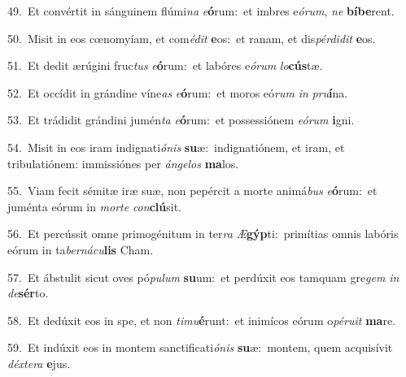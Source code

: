 {\numbfont\textcolor{\numbcolor}{49.}}~Et convértit in sánguinem flúmi\textit{na} \textit{e}\-\textbf{ó}rum:~\star et imbres e\-\textit{ó}\-\textit{rum}, \textit{ne} \textbf{bí}\-\textbf{be}rent.\par
{\numbfont\textcolor{\numbcolor}{50.}}~Misit in eos cœnomyíam, et com\-\textit{é}\-\textit{dit} \textbf{e}\-os:~\star et ranam, et dis\-\textit{pér}\-\textit{di}\textit{dit} \textbf{e}\-os.\par
{\numbfont\textcolor{\numbcolor}{51.}}~Et dedit ærúgini fruc\textit{tus} \textit{e}\-\textbf{ó}rum:~\star et labóres e\-\textit{ó}\-\textit{rum} \textit{lo}\-\textbf{cús}tæ.\par
{\numbfont\textcolor{\numbcolor}{52.}}~Et occídit in grándine víne\textit{as} \textit{e}\-\textbf{ó}rum:~\star et moros eó\textit{rum} \textit{in} \textit{pru}\-\textbf{í}na.\par
{\numbfont\textcolor{\numbcolor}{53.}}~Et trádidit grándini jumén\textit{ta} \textit{e}\-\textbf{ó}rum:~\star et possessiónem \textit{e}\-\textit{ó}\textit{rum} \textbf{i}\-gni.\par
{\numbfont\textcolor{\numbcolor}{54.}}~Misit in eos iram indignati\-\textit{ó}\-\textit{nis} \textbf{su}\-æ:~\star indignatiónem, et iram, et tribulatiónem: immissiónes per \textit{án}\-\textit{ge}\textit{los} \textbf{ma}\-los.\par
{\numbfont\textcolor{\numbcolor}{55.}}~Viam fecit sémitæ iræ suæ, non pepércit a morte animá\textit{bus} \textit{e}\-\textbf{ó}rum:~\star et juménta eórum in \textit{mor}\-\textit{te} \textit{con}\-\textbf{clú}sit.\par
{\numbfont\textcolor{\numbcolor}{56.}}~Et percússit omne primogénitum in ter\textit{ra} \textit{Æ}\-\textbf{gýp}ti:~\star primítias omnis labóris eórum in ta\-\textit{ber}\-\textit{ná}\textit{cu}\textbf{lis} Cham.\par
{\numbfont\textcolor{\numbcolor}{57.}}~Et ábstulit sicut oves pó\-\textit{pu}\-\textit{lum} \textbf{su}\-um:~\star et perdúxit eos tamquam gre\textit{gem} \textit{in} \textit{de}\-\textbf{sér}to.\par
{\numbfont\textcolor{\numbcolor}{58.}}~Et dedúxit eos in spe, et non \textit{ti}\-\textit{mu}\textbf{é}runt:~\star et inimícos eórum o\-\textit{pé}\-\textit{ru}\textit{it} \textbf{ma}\-re.\par
{\numbfont\textcolor{\numbcolor}{59.}}~Et indúxit eos in montem sanctificati\-\textit{ó}\-\textit{nis} \textbf{su}\-æ:~\star montem, quem acquisívit \textit{déx}\-\textit{te}\textit{ra} \textbf{e}\-jus.\par

